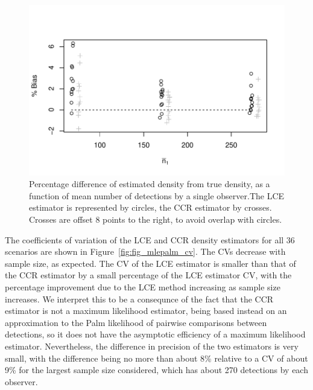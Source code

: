 \documentclass[useAMS, usenatbib, referee]{biom}\usepackage[]{graphicx}\usepackage[]{color}
\makeatletter
\def\maxwidth{ %
  \ifdim\Gin@nat@width>\linewidth
    \linewidth
  \else
    \Gin@nat@width
  \fi
}
\newenvironment{knitrout}{}{} %
\makeatother
\begin{document}
\begin{knitrout}
\color{fgcolor}\begin{figure}

{\centering \includegraphics[width=\maxwidth]{figs/fig_mlepalm_bias-1} 

}

\caption{Percentage difference of estimated density from true density, as a function of mean number of detections by a single observer.The LCE estimator is represented by circles, the CCR estimator by crosses. Crosses are offset 8 points to the right, to avoid overlap with circles. }\label{fig:fig_mlepalm_bias}
\end{figure}


\end{knitrout}

The coefficients of variation of the LCE and CCR density estimators for all 36 scenarios are shown in Figure~\ref{fig:fig_mlepalm_cv}. The CVs decrease with sample size, as expected. The CV of the LCE estimator is smaller than that of the CCR estimator by a small percentage of the LCE estimator CV, with the percentage improvement due to the LCE method increasing as sample size increases. We interpret this to be a consequnce of the fact that the CCR estimator is not a maximum likelihood estimator, being based instead on an approximation to the Palm likelihood of pairwise comparisons between detections, so it does not have the asymptotic efficiency of a maximum likelihood estimator. Nevertheless, the difference in precision of the two estimators is very small, with the difference being no more than about 8\% relative to a CV of about 9\% for the largest sample size considered, which has about 270 detections by each observer.
\end{document}
